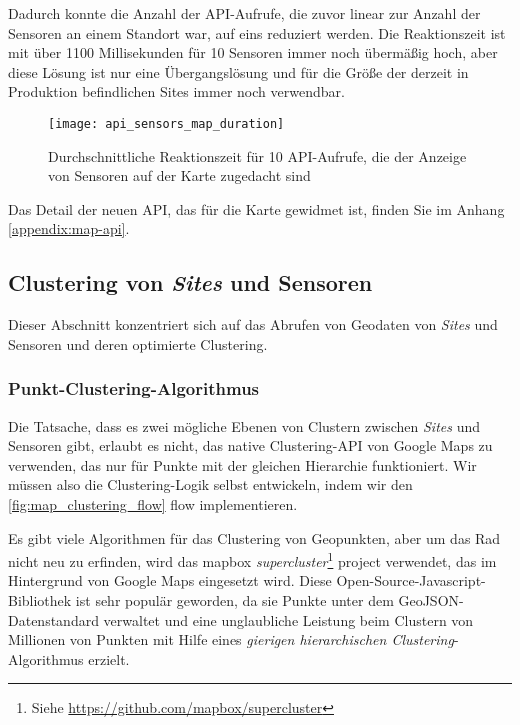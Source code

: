 Dadurch konnte die Anzahl der API-Aufrufe, die zuvor linear zur Anzahl der Sensoren an einem Standort war, auf eins reduziert werden.
Die Reaktionszeit ist mit über 1100 Millisekunden für 10 Sensoren immer noch übermäßig hoch, aber diese Lösung ist nur eine Übergangslösung und für die Größe der derzeit in Produktion befindlichen Sites immer noch verwendbar.

\begin{figure}[H]
  \centering
  \texttt{[image: api\_sensors\_map\_duration]}
  \caption{Durchschnittliche Reaktionszeit für 10 API-Aufrufe, die der Anzeige von Sensoren auf der Karte zugedacht sind}
  \label{fig:api_sensors_map_duration}
\end{figure}

Das Detail der neuen API, das für die Karte gewidmet ist, finden Sie im Anhang \ref{appendix:map-api}.

\subsection{Clustering von \textit{Sites} und Sensoren}

Dieser Abschnitt konzentriert sich auf das Abrufen von Geodaten von \textit{Sites} und Sensoren und deren optimierte Clustering.

\subsubsection{Punkt-Clustering-Algorithmus}

Die Tatsache, dass es zwei mögliche Ebenen von Clustern zwischen \textit{Sites} und Sensoren gibt, erlaubt es nicht, das native Clustering-API von Google Maps zu verwenden, das nur für Punkte mit der gleichen Hierarchie funktioniert.
Wir müssen also die Clustering-Logik selbst entwickeln, indem wir den \ref{fig:map_clustering_flow} flow implementieren.

Es gibt viele Algorithmen für das Clustering von Geopunkten, aber um das Rad nicht neu zu erfinden, wird das mapbox \textit{supercluster}\footnote{Siehe \href{https://github.com/mapbox/supercluster}{https://github.com/mapbox/supercluster}} project verwendet, das im Hintergrund von Google Maps eingesetzt wird.
Diese Open-Source-Javascript-Bibliothek ist sehr populär geworden, da sie Punkte unter dem GeoJSON-Datenstandard\cite{rfc7946} verwaltet und eine unglaubliche Leistung beim Clustern von Millionen von Punkten mit Hilfe eines \textit{gierigen hierarchischen Clustering}-Algorithmus\cite{supercluster} erzielt.

